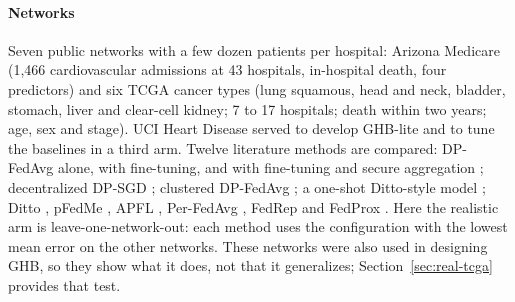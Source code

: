 \paragraph{Networks} Seven public networks with a few dozen patients per hospital: Arizona Medicare \cite{hilbe2011negative} (1,466 cardiovascular admissions at 43 hospitals, in-hospital death, four predictors) and six TCGA cancer types \cite{grossman2016toward,weinstein2013cancer} (lung squamous, head and neck, bladder, stomach, liver and clear-cell kidney; 7 to 17 hospitals; death within two years; age, sex and stage). UCI Heart Disease \cite{detrano1989international} served to develop GHB-lite and to tune the baselines in a third arm. Twelve literature methods are compared: DP-FedAvg \cite{mcmahan2018learning} alone, with fine-tuning, and with fine-tuning and secure aggregation \cite{bonawitz2017practical}; decentralized DP-SGD \cite{lian2017can}; clustered DP-FedAvg \cite{ghosh2020efficient}; a one-shot Ditto-style model \cite{li2021ditto}; Ditto \cite{li2021ditto}, pFedMe \cite{tdinh2020personalized}, APFL \cite{deng2020adaptive}, Per-FedAvg \cite{fallah2020personalized}, FedRep \cite{collins2021exploiting} and FedProx \cite{li2020federated}. Here the realistic arm is leave-one-network-out: each method uses the configuration with the lowest mean error on the other networks. These networks were also used in designing GHB, so they show what it does, not that it generalizes; Section~\ref{sec:real-tcga} provides that test.

